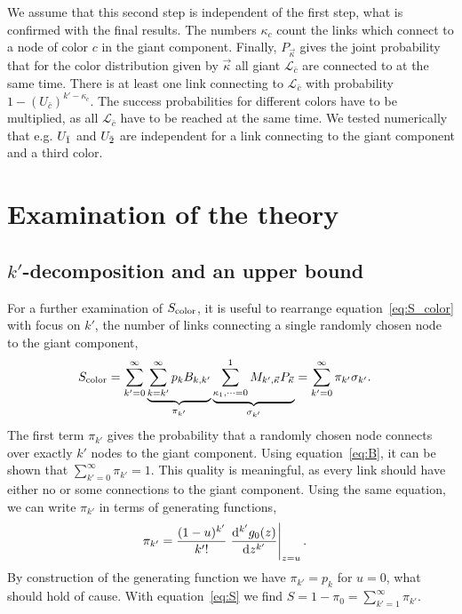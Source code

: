 \documentclass[aps, pre, onecolumn, a4paper, floatfix]{revtex4}
\begin{document}
We assume that this second step is independent of the first step, 
what is confirmed with the final results. 
The numbers $\kappa_c$ count the links which connect to a node of color $c$ in the giant component. 
Finally, $P_{\vec \kappa}$ gives the joint probability 
that for the color distribution given by $\vec \kappa$ 
all giant $\mathcal{L}_{\bar c}$ are connected to at the same time. 
There is at least one link connecting to ${\mathcal L}_{\bar c}$ 
with probability $1-(U_{\bar c})^{k' - \kappa_c }$. 
The success probabilities for different colors have to be multiplied, 
as all ${\mathcal L}_{\bar c}$ have to be reached at the same time. 
We tested numerically that e.g. $U_{\bar{\rm 1}}$ and $U_{\bar{\rm 2}}$ are independent for a link 
connecting to the giant component and a third color. 




\section{Examination of the theory}


\subsection{$k'$-decomposition and an upper bound}

For a further examination of $S_{\rm color}$, 
it is useful to rearrange equation~\ref{eq:S_color} with focus on $k'$, 
the number of links connecting a single randomly chosen node to the giant component, 
\begin{align}
S_{\rm color} &= \sum_{k'=0}^{\infty} \underbrace{\sum_{k=k'}^{\infty} p_k B_{k,k'}}_{\pi_{k'}}
\underbrace{{\sum_{\kappa_1,\dots=0}^1 M_{k',\vec \kappa} P_{\vec \kappa}}}_{\sigma_{k'}}
 = \sum_{k'=0}^{\infty} \pi_{k'}\sigma_{k'}.
\end{align}
The first term $\pi_{k'}$ gives the probability that a randomly chosen node 
connects over exactly $k'$ nodes to the giant component. 
Using equation~\ref{eq:B}, it can be shown that $\sum_{k'=0}^{\infty}\pi_{k'}=1$. 
This quality is meaningful, as every link should have 
either no or some connections to the giant component. 
Using the same equation, we can write $\pi_{k'}$ in terms of generating functions, 
\begin{align}
\pi_{k'} &= \frac{(1-u)^{k'}}{k'!}\left.\frac{{\rm d}^{k'}g_0(z)}{{\rm d}z^{k'}}\right|_{z=u}.
\end{align}
By construction of the generating function we have $\pi_{k'}=p_k$ for $u=0$, 
what should hold of cause. 
With equation~\ref{eq:S} we find $S=1-\pi_0=\sum_{k'=1}^{\infty}\pi_{k'}$. 
\end{document}
